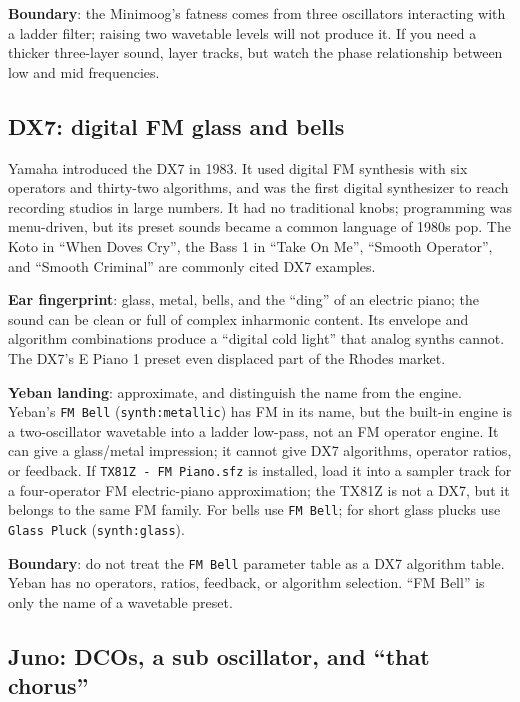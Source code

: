 \textbf{Boundary}: the Minimoog's fatness comes from three oscillators
interacting with a ladder filter; raising two wavetable levels will not
produce it. If you need a thicker three-layer sound, layer tracks, but watch
the phase relationship between low and mid frequencies.

\subsection{DX7: digital FM glass and bells}
\label{sec:iconic-dx7}

Yamaha introduced the DX7 in 1983. It used digital FM synthesis with six
operators and thirty-two algorithms, and was the first digital synthesizer to
reach recording studios in large numbers. It had no traditional knobs;
programming was menu-driven, but its preset sounds became a common language
of 1980s pop. The Koto in ``When Doves Cry'', the Bass 1 in ``Take On Me'',
``Smooth Operator'', and ``Smooth Criminal'' are commonly cited DX7 examples.

\textbf{Ear fingerprint}: glass, metal, bells, and the ``ding'' of an
electric piano; the sound can be clean or full of complex inharmonic content.
Its envelope and algorithm combinations produce a ``digital cold light'' that
analog synths cannot. The DX7's E Piano 1 preset even displaced part of the
Rhodes market.

\textbf{Yeban landing}: approximate, and distinguish the name from the
engine. Yeban's \texttt{FM Bell} (\texttt{synth:metallic}) has FM in its name,
but the built-in engine is a two-oscillator wavetable into a ladder low-pass,
not an FM operator engine. It can give a glass/metal impression; it cannot
give DX7 algorithms, operator ratios, or feedback. If
\texttt{TX81Z - FM Piano.sfz} is installed, load it into a sampler track for a
four-operator FM electric-piano approximation; the TX81Z is not a DX7, but it
belongs to the same FM family. For bells use \texttt{FM Bell}; for short
glass plucks use \texttt{Glass Pluck} (\texttt{synth:glass}).

\textbf{Boundary}: do not treat the \texttt{FM Bell} parameter table as a DX7
algorithm table. Yeban has no operators, ratios, feedback, or algorithm
selection. ``FM Bell'' is only the name of a wavetable preset.

\subsection{Juno: DCOs, a sub oscillator, and ``that chorus''}
\label{sec:iconic-juno}

